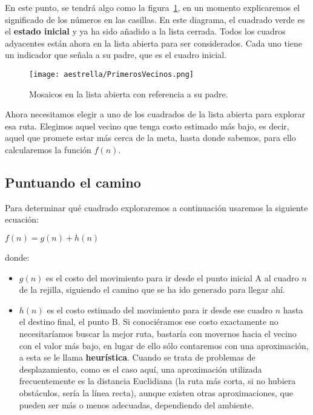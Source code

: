 En este punto, se tendrá algo como la figura~\ref{fig:fig2P4}, en un momento explicaremos el significado de los números en las casillas. En este diagrama, el cuadrado verde es el \textbf{estado inicial} y ya ha sido añadido a la lista cerrada. Todos los cuadros adyacentes están ahora en la lista abierta para ser considerados. Cada uno tiene un indicador que señala a su padre, que es el cuadro inicial.

\begin{figure}[h]
  \centering
  \texttt{[image: aestrella/PrimerosVecinos.png]}
  \caption{Mosaicos en la lista abierta con referencia a su padre.}
  \label{fig:fig2P4}
\end{figure}

Ahora necesitamos elegir a uno de los cuadrados de la lista abierta para explorar esa ruta. Elegimos aquel vecino que tenga costo estimado más bajo, es decir, aquel que promete estar más cerca de la meta, hasta donde sabemos, para ello calcularemos la función $f(n)$.

\subsection{Puntuando el camino}

Para determinar qué cuadrado exploraremos a continuación usaremos la siguiente ecuación:

\begin{center}
\(f(n) = g(n) + h(n)\)
\end{center}

donde:

\begin{itemize}
  \item \(g(n)\) es el costo del movimiento para ir desde el punto inicial A al cuadro \(n\) de la rejilla, siguiendo el camino que se ha ido generado para llegar ahí.

  \item \(h(n)\) es el costo estimado del movimiento para ir desde ese cuadro \(n\) hasta el destino final, el punto B. Si conociéramos ese costo exactamente no necesitaríamos buscar la mejor ruta, bastaría con movernos hacia el vecino con el valor más bajo, en lugar de ello sólo contaremos con una aproximación, a esta se le llama \textbf{heurística}.  Cuando se trata de problemas de desplazamiento, como es el caso aquí, una aproximación utilizada frecuentemente es la distancia Euclidiana (la ruta más corta, si no hubiera obstáculos, sería la línea recta), aunque existen otras aproximaciones, que pueden ser más o menos adecuadas, dependiendo del ambiente.
\end{itemize}

